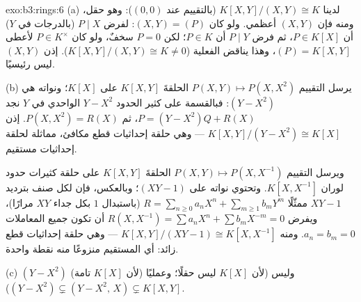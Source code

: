 \begin{solution}{exo:b3:rings:6}
(a) لدينا $K[X,Y]/(X,Y) \cong K$ (بالتقييم عند $(0,0)$): وهو حقل، ومنه فإن
$(X,Y)$ أعظمي. ولو كان $(X, Y) = (P)$: لفرض $P \mid X$ (بالدرجات
في $Y$) أن $P \in K[X]$، ثم فرض $P \mid Y$ أن $P \in K$؛ لكن
$P =
0$ سخفٌ، ولو كان $P \in K^\times$ لأعطى $(P) = K[X,Y]$،
وهذا يناقض الفعلية ($K[X,Y]/(X,Y) \cong K \neq 0$). إذن $(X,Y)$ ليس رئيسيًا.

(b) يرسل التقييم $P(X, Y) \mapsto P(X, X^2)$ الحلقةَ $K[X,Y]$ على $K[X]$؛ ونواته هي
$(Y - X^2)$: فبالقسمة على كثير الحدود $Y - X^2$ الواحدي في $Y$
نجد $P = (Y - X^2)Q + R(X)$، ثم $P(X, X^2) =
R(X)$. إذن $K[X,Y]/(Y - X^2) \cong K[X]$ --- وهي حلقة إحداثيات قطع
مكافئ، مماثلة لحلقة إحداثيات مستقيم.

ويرسل التقييم $P(X, Y) \mapsto P(X, X^{-1})$ الحلقةَ $K[X, Y]$ على حلقة كثيرات حدود
لوران $K[X, X^{-1}]$. وتحتوي نواته على $(XY - 1)$؛ وبالعكس، فإن
لكل صنف بترديد $XY - 1$ ممثّلًا $R = \sum_{n \geq 0} a_nX^n + \sum_{m \geq 1} b_m
Y^m$ (باستبدال $1$ بكل جداء
$XY$ مرارًا)، ويفرض $R(X,
X^{-1}) = \sum a_n X^n + \sum b_m X^{-m} = 0$ أن تكون جميع المعاملات $a_n =
b_m = 0$. ومنه
$K[X, Y]/(XY - 1) \cong K[X, X^{-1}]$ --- وهي حلقة إحداثيات قطع زائد: أي المستقيم منزوعًا منه
نقطة واحدة.

(c)  $(Y - X^2)$  (لأن  $K[X]$ تامة) وليس
 (لأن $K[X]$ ليس حقلًا؛ وعمليًا $(Y - X^2) \subsetneq
(Y - X^2,\, X) \subsetneq K[X,Y]$).
\end{solution}

